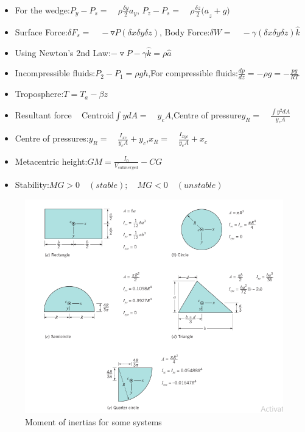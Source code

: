 \documentclass[12pt]{article}
\begin{document}
\begin{itemize}
\item For the wedge:\quad ${ P }_{ y }-{ P }_{ s }=\quad \rho \frac { \delta y }{ 2 } { a }_{ y }$, \quad ${ P }_{ z }-{ P }_{ s }=\quad \rho \frac { \delta z }{ 2 } { (a }_{ z }+g)$
\item Surface Force:\quad$\delta { F }_{ s }=\quad -\triangledown P(\delta x\delta y\delta z)$, \quad Body Force:\quad$\delta W=\quad -\gamma (\delta x\delta y\delta z)\hat { k } $
\item Using Newton's 2nd Law:\quad$-\triangledown P- \gamma \hat { k } = \rho \hat { a } $
\item Incompressible fluids:\quad${ P }_{ 2 }-{ P }_{ 1 }=\rho gh$,\quad For compressible fluids:\quad$\frac { dp }{ dz } = -\rho g = -\frac { pg }{ RT } $
\item Troposphere:\quad$T={ T }_{ a }-\beta z$
\item Resultant force ~ Centroid\quad$\int { ydA=\quad { y }_{ c }A } $,\quad Centre of pressure\quad${ y }_{ R }=\quad \frac { \int { { y }^{ 2 }dA }  }{ { y }_{ c }A } $
\item Centre of pressures:\quad${ y }_{ R }=\quad \frac { { I }_{ xc } }{ { y }_{ c }A } +{ y }_{ c }$,\quad${ x }_{ R }=\quad \frac { { I }_{ xyc } }{ { y }_{ c }A } +{ x }_{ c }$
\item Metacentric height:\quad$GM=\frac { { I }_{ 0 } }{ { V }_{ submerged } } -CG$
\item Stability:\quad$MG>0\quad (stable);\quad MG<0\quad (unstable)$
\end{itemize}
\begin{figure}[ht!]
\centering
\includegraphics{Capture.png}
\caption{Moment of inertias for some systems}
\label{overflow}
\end{figure}
\end{document}
